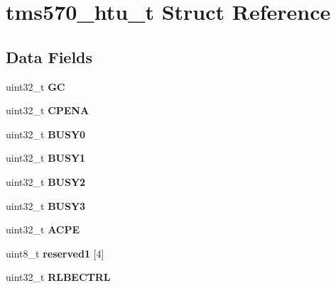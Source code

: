 \hypertarget{structtms570__htu__t}{}\section{tms570\+\_\+htu\+\_\+t Struct Reference}
\label{structtms570__htu__t}
\subsection*{Data Fields}
\begin{DoxyCompactItemize}
\item 
\mbox{\label{structtms570__htu__t_a60e0b2aa2c7a83ef6aeb95f68bd088ef}} 
uint32\+\_\+t {\bfseries GC}
\item 
\mbox{\label{structtms570__htu__t_a37a8d85c69df9cc706b743e166f1706a}} 
uint32\+\_\+t {\bfseries C\+P\+E\+NA}
\item 
\mbox{\label{structtms570__htu__t_a91539bc0b68688b0991c796569cd2e2f}} 
uint32\+\_\+t {\bfseries B\+U\+S\+Y0}
\item 
\mbox{\label{structtms570__htu__t_a16e91bae3febc010ac71b099e4cdd4c8}} 
uint32\+\_\+t {\bfseries B\+U\+S\+Y1}
\item 
\mbox{\label{structtms570__htu__t_a7aa9527e21788e6f9e21714d71fc8df9}} 
uint32\+\_\+t {\bfseries B\+U\+S\+Y2}
\item 
\mbox{\label{structtms570__htu__t_a7407162b3d50e1b7af0b92d69678cd86}} 
uint32\+\_\+t {\bfseries B\+U\+S\+Y3}
\item 
\mbox{\label{structtms570__htu__t_a15a2eb5e439267c3b59c974e854d5700}} 
uint32\+\_\+t {\bfseries A\+C\+PE}
\item 
\mbox{\label{structtms570__htu__t_af3dde3567e45f7062f8e077e527829a6}} 
uint8\+\_\+t {\bfseries reserved1} \mbox{[}4\mbox{]}
\item 
\mbox{\label{structtms570__htu__t_a64198defd02188d40f7a869b26583769}} 
uint32\+\_\+t {\bfseries R\+L\+B\+E\+C\+T\+RL}
\item 

\end{DoxyCompactItemize}
